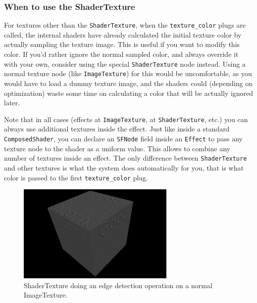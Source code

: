 \documentclass{egpubl}
\begin{document}
\subsubsection{When to use the ShaderTexture}

For textures other than the \texttt{ShaderTexture},
when the \texttt{texture\_color} plugs are called,
the internal shaders have already calculated the initial texture
color by actually sampling the texture image. This is useful if you
want to modify this color. If you'd rather ignore the normal
sampled color, and always override it with your own, consider using
the special \texttt{ShaderTexture} node instead. Using
a normal texture node (like \texttt{ImageTexture}) for this
would be uncomfortable, as you would have to load a dummy texture image,
and the shaders could (depending on optimization) waste some time
on calculating a color that will be actually ignored later.

Note that in all cases (effects at \texttt{ImageTexture},
at \texttt{ShaderTexture}, etc.) you can always use additional
textures inside the effect. Just like inside a standard \texttt{ComposedShader},
you can declare an \texttt{SFNode} field inside an \texttt{Effect}
to pass any texture node to the shader as a uniform value.
This allows to combine any number of textures inside an effect.
The only difference
between \texttt{ShaderTexture} and other textures is what the system
does automatically for you, that is what color is passed
to the first \texttt{texture\_color} plug.

\begin{figure}[H]
  \centering
  \includegraphics[width=3in]{shader_texture_edge_detection}
  \caption{ShaderTexture doing an edge detection operation on a normal ImageTexture.}
\end{figure}
\end{document}
